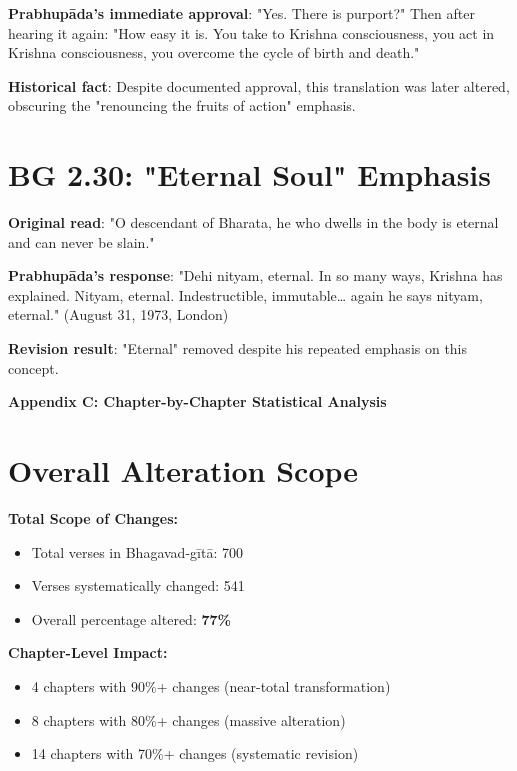 \documentclass[11pt,twoside]{book}
\begin{document}
\textbf{\textbf{Prabhupāda's immediate approval}}: "Yes. There is purport?" Then after hearing it again: "How easy it is. You take to Krishna consciousness, you act in Krishna consciousness, you overcome the cycle of birth and death."

\textbf{\textbf{Historical fact}}: Despite documented approval, this translation was later altered, obscuring the "renouncing the fruits of action" emphasis.
\section*{BG 2.30: "Eternal Soul" Emphasis}
\label{sec:org1c46c21}
\textbf{\textbf{Original read}}: "O descendant of Bharata, he who dwells in the body is eternal and can never be slain."

\textbf{\textbf{Prabhupāda's response}}: "Dehi nityam, eternal. In so many ways, Krishna has explained. Nityam, eternal. Indestructible, immutable\ldots{} again he says nityam, eternal." (August 31, 1973, London)

\textbf{\textbf{Revision result}}: "Eternal" removed despite his repeated emphasis on this concept.

\clearpage
\pagestyle{sectionopening}
\thispagestyle{sectionopening}
\markboth{}{}
\markright{}
\vspace*{0.25\textheight}
\begin{center}
{\Huge\bfseries Appendix C: Chapter-by-Chapter Statistical Analysis}
\end{center}
\newpage
\section*{Overall Alteration Scope}
\label{sec:org3ffbaf7}

\textbf{\textbf{Total Scope of Changes:}}
\begin{itemize}
\item Total verses in Bhagavad-gītā: 700
\item Verses systematically changed: 541
\item Overall percentage altered: \textbf{\textbf{77\%}}
\end{itemize}

\textbf{\textbf{Chapter-Level Impact:}}
\begin{itemize}
\item 4 chapters with 90\%+ changes (near-total transformation)
\item 8 chapters with 80\%+ changes (massive alteration)
\item 14 chapters with 70\%+ changes (systematic revision)
\end{itemize}
\end{document}
